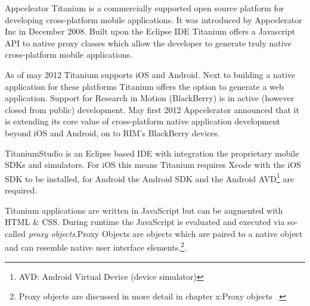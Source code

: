 
Appceleator Titanium is a commercially supported open source platform for developing cross-platform mobile applications. It was introduced by Appcelerator Inc in December 2008. Built upon the Eclipse IDE Titanium offers a Javascript API to native proxy classes which allow the developer to generate truly native cross-platform mobile applications. 

As of may 2012 Titanium supports iOS and Android. Next to building a native application for these platforms Titanium offers the option to generate a web application. 
Support for Research in Motion (BlackBerry) is in active (however closed from public) development. May first 2012 Appcelerator announced that it is extending its core value of cross-platform native application development beyond iOS and Android, on to RIM's BlackBerry devices.\cite{Asher2012}

TitaniumStudio is an Eclipse based IDE with integration the proprietary mobile SDKs and simulators. For iOS this means Titanium requires Xcode with the iOS SDK to be installed, for Android the Android SDK and the Android AVD\footnote{AVD: Android Virtual Device (device simulator)} are required.

Titanium applications are written in JavaScript but can be augmented with HTML \& CSS. During runtime the JavaScript is evaluated and executed via so-called \emph{proxy objects}.Proxy Objects are objects which are paired to a native object and can resemble native user interface elements.\footnote{Proxy objects are discussed in more detail in chapter x:Proxy objects \   }.



